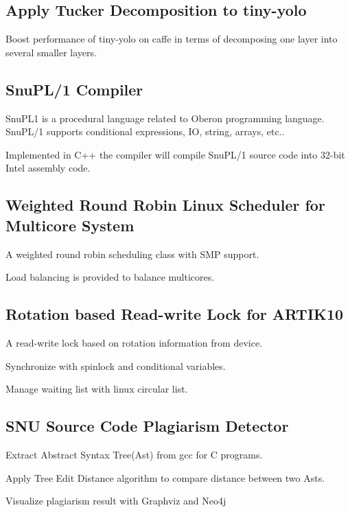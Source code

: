 \documentclass[letterpaper]{article}
\renewenvironment{itemize}{
  \begin{list}{}{
    \setlength{\leftmargin}{1.5em}
  }
}{
  \end{list}
}
\begin{document}
\subsection*{\textbf{Apply Tucker Decomposition to tiny-yolo}}
\begin{itemize}
	\item Boost performance of tiny-yolo on caffe in terms of decomposing one layer into several smaller layers. 
\end{itemize}

\subsection*{\textbf{SnuPL/1 Compiler}}
\begin{itemize}
\item SnuPL1 is a procedural language related to Oberon programming language. SnuPL/1 supports conditional expressions, IO, string, arrays, etc..
\item Implemented in C++ the compiler will compile SnuPL/1 source code into 32-bit Intel assembly code.	\\
\end{itemize}
\subsection*{\textbf{Weighted Round Robin Linux Scheduler for Multicore System}}
\begin{itemize}
	\item A weighted round robin scheduling class with SMP support.
	\item Load balancing is provided to balance multicores.
\end{itemize}
\subsection*{\textbf{Rotation based Read-write Lock for ARTIK10}}
\begin{itemize}
\item A read-write lock based on rotation information from device.	
\item Synchronize with spinlock and conditional variables.	
\item Manage waiting list with linux circular list.	\\
\end{itemize}
\subsection*{\textbf{SNU Source Code Plagiarism Detector}}
\begin{itemize}
\item Extract Abstract Syntax Tree(Ast) from gcc for C programs.	
\item Apply Tree Edit Distance algorithm to compare distance between two Asts.	
\item Visualize plagiarism result with Graphviz and Neo4j	\\
\end{itemize}
\end{document}
